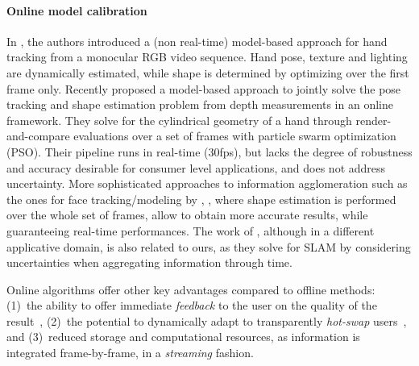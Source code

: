 \paragraph{Online model calibration}
In \cite{delagorce2011model}, the authors introduced a (non real-time) model-based approach for hand tracking from a monocular RGB video sequence. Hand pose, texture and lighting are dynamically estimated, while shape is determined by optimizing over the first frame only.
Recently  proposed a model-based approach to jointly solve the pose tracking and shape estimation problem from depth measurements in an online framework. They solve for the cylindrical geometry of a hand through render-and-compare evaluations over a set of frames with particle swarm optimization (PSO). Their pipeline runs in real-time (30fps), but lacks the degree of robustness and accuracy desirable for consumer level applications, and does not address uncertainty.
More sophisticated approaches to information agglomeration such as the ones for face tracking/modeling by ,  , where shape estimation is performed over the whole set of frames, allow to obtain more accurate results, while guaranteeing real-time performances. 
The work of , although in a different applicative domain, is also related to ours, as they solve for SLAM by considering uncertainties when aggregating information through time.

Online algorithms offer other key advantages compared to offline methods: (1)~the ability to offer immediate \emph{feedback} to the user on the quality of the result~\cite{kinfu}, (2)~the potential to dynamically adapt to transparently \emph{hot-swap} users~\cite{bouaziz2013online}, and (3)~reduced storage and computational resources, as information is integrated frame-by-frame, in a \emph{streaming} fashion.

